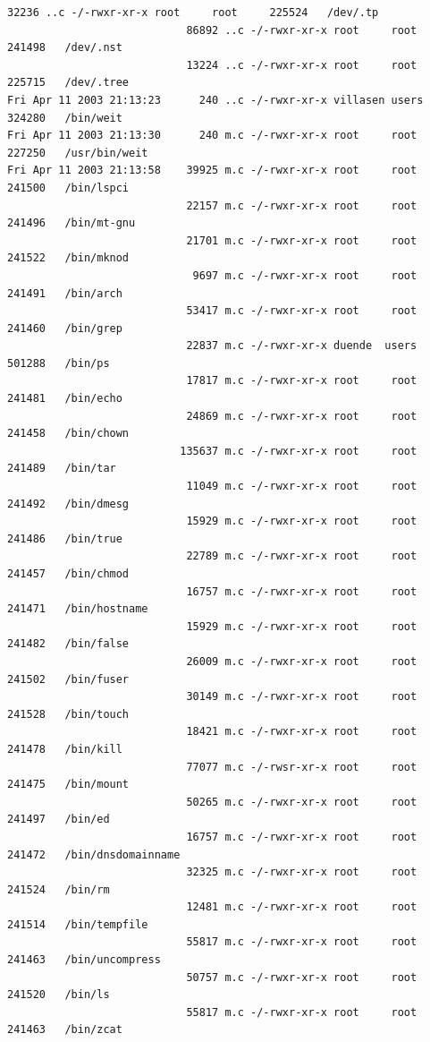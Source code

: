 {\begin{lstlisting}[style=terminal]
                            32236 ..c -/-rwxr-xr-x root     root     225524   /dev/.tp
                            86892 ..c -/-rwxr-xr-x root     root     241498   /dev/.nst
                            13224 ..c -/-rwxr-xr-x root     root     225715   /dev/.tree
Fri Apr 11 2003 21:13:23      240 ..c -/-rwxr-xr-x villasen users    324280   /bin/weit
Fri Apr 11 2003 21:13:30      240 m.c -/-rwxr-xr-x root     root     227250   /usr/bin/weit
Fri Apr 11 2003 21:13:58    39925 m.c -/-rwxr-xr-x root     root     241500   /bin/lspci
                            22157 m.c -/-rwxr-xr-x root     root     241496   /bin/mt-gnu
                            21701 m.c -/-rwxr-xr-x root     root     241522   /bin/mknod
                             9697 m.c -/-rwxr-xr-x root     root     241491   /bin/arch
                            53417 m.c -/-rwxr-xr-x root     root     241460   /bin/grep
                            22837 m.c -/-rwxr-xr-x duende  users    501288   /bin/ps
                            17817 m.c -/-rwxr-xr-x root     root     241481   /bin/echo
                            24869 m.c -/-rwxr-xr-x root     root     241458   /bin/chown
                           135637 m.c -/-rwxr-xr-x root     root     241489   /bin/tar
                            11049 m.c -/-rwxr-xr-x root     root     241492   /bin/dmesg
                            15929 m.c -/-rwxr-xr-x root     root     241486   /bin/true
                            22789 m.c -/-rwxr-xr-x root     root     241457   /bin/chmod
                            16757 m.c -/-rwxr-xr-x root     root     241471   /bin/hostname
                            15929 m.c -/-rwxr-xr-x root     root     241482   /bin/false
                            26009 m.c -/-rwxr-xr-x root     root     241502   /bin/fuser
                            30149 m.c -/-rwxr-xr-x root     root     241528   /bin/touch
                            18421 m.c -/-rwxr-xr-x root     root     241478   /bin/kill
                            77077 m.c -/-rwsr-xr-x root     root     241475   /bin/mount
                            50265 m.c -/-rwxr-xr-x root     root     241497   /bin/ed
                            16757 m.c -/-rwxr-xr-x root     root     241472   /bin/dnsdomainname
                            32325 m.c -/-rwxr-xr-x root     root     241524   /bin/rm
                            12481 m.c -/-rwxr-xr-x root     root     241514   /bin/tempfile
                            55817 m.c -/-rwxr-xr-x root     root     241463   /bin/uncompress
                            50757 m.c -/-rwxr-xr-x root     root     241520   /bin/ls
                            55817 m.c -/-rwxr-xr-x root     root     241463   /bin/zcat

\end{lstlisting}}
